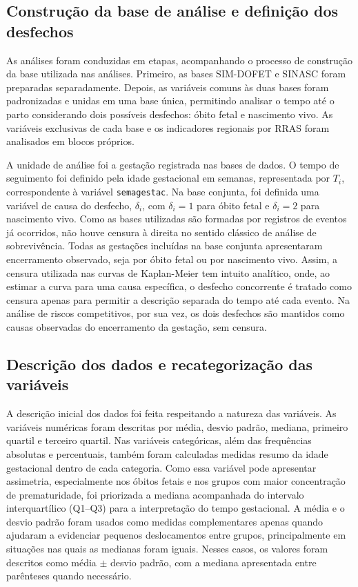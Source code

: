 \subsection{Construção da base de análise e definição dos desfechos}

As análises foram conduzidas em etapas, acompanhando o processo de construção da 
base utilizada nas análises. Primeiro, as bases SIM-DOFET e SINASC foram preparadas
separadamente. Depois, as variáveis comuns às duas bases foram padronizadas e
unidas em uma base única, permitindo analisar o tempo até o parto considerando dois 
possíveis desfechos: óbito fetal e nascimento vivo. As variáveis exclusivas de cada 
base e os indicadores regionais por RRAS foram analisados em blocos próprios.

A unidade de análise foi a gestação registrada nas bases de dados. O tempo de 
seguimento foi definido pela idade gestacional em semanas, representada por 
$T_i$, correspondente à variável \texttt{semagestac}. Na base conjunta, foi 
definida uma variável de causa do desfecho, $\delta_i$, com $\delta_i=1$ para 
óbito fetal e $\delta_i=2$ para nascimento vivo. Como as bases utilizadas são 
formadas por registros de eventos já ocorridos, não houve censura à direita 
no sentido clássico de análise de sobrevivência. Todas as gestações incluídas 
na base conjunta apresentaram encerramento observado, seja por óbito fetal 
ou por nascimento vivo. Assim, a censura utilizada nas curvas de Kaplan-Meier 
tem intuito analítico, onde, ao estimar a curva para uma causa específica, 
o desfecho concorrente é tratado como censura apenas para permitir a descrição 
separada do tempo até cada evento. Na análise de riscos competitivos, por sua vez, 
os dois desfechos são mantidos como causas observadas do encerramento da gestação, 
sem censura.

\subsection{Descrição dos dados e recategorização das variáveis}

A descrição inicial dos dados foi feita respeitando a natureza das variáveis. 
As variáveis numéricas foram descritas por média, desvio padrão, mediana, primeiro 
quartil e terceiro quartil. Nas variáveis categóricas, além das frequências 
absolutas e percentuais, também foram calculadas medidas resumo da idade gestacional 
dentro de cada categoria. Como essa variável pode apresentar assimetria, especialmente 
nos óbitos fetais e nos grupos com maior concentração de prematuridade, foi priorizada 
a mediana acompanhada do intervalo interquartílico (Q1--Q3) para a interpretação 
do tempo gestacional. A média e o desvio padrão foram usados como medidas 
complementares apenas quando ajudaram a evidenciar pequenos deslocamentos entre 
grupos, principalmente em situações nas quais as medianas foram iguais. Nesses 
casos, os valores foram descritos como média $\pm$ desvio padrão, com a mediana 
apresentada entre parênteses quando necessário.

